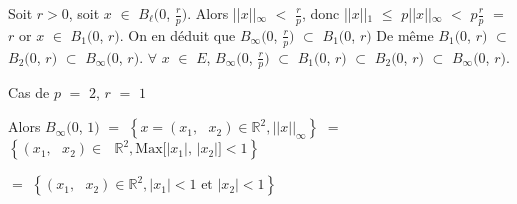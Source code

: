 \documentclass{article}
\begin{document}
\smallbreak 
Soit $r>0$, soit $x$ $\in$ $B_{\ell}(0$, $\frac{r}{p})$. Alors ||$x$||$_{\infty}$ $<$ $\frac{r}{p}$, donc ||$x$||$_1$ $\leqslant$ $p$||$x$||$_{\infty}$ $<$ $p\frac{r}{p}$ $=$ $r$ or $x$ $\in$ $B_1(0$, $r)$.
\smallbreak
On en déduit que $B_{\infty}(0$, $\frac{r}{p})$ $\subset$ $B_1(0$, $r)$
De même $B_1(0$, $r)$ $\subset$ $B_2(0$, $r)$ $\subset$ $B_{\infty}(0$, $r)$.
\bigbreak
\center 
$\forall$ $x$ $\in$ $E$, $B_{\infty}(0$, $\frac{r}{p})$ $\subset$ $B_1(0$, $r)$ $\subset$ $B_2(0$, $r)$ $\subset$ $B_{\infty}(0$, $r)$.

\flushleft
\hspace*{1cm}Cas de $p$ $=$ $2$, $r$ $=$ $1$
\smallbreak

\begin{multicols}{2}

\parindent=1.5cm
Alors $B_{\infty}(0$, $1)$ $=$ $\left\{x=(x_1,\text{ }x_2) \in \mathbb{R}^2,||x||_{\infty} \right\}$ \smallbreak $=$ $\left\{(x_1,\text{ }x_2) \in \text{ }\mathbb{R}^2,\text{Max[|}x_1\text{|, |}x_2\text{|]} <1 \right\}$

\smallbreak
$=$ $\left\{(x_1,\text{ }x_2) \in \mathbb{R}^2,|x_1| < 1 \text{ et } |x_2| < 1 \right\}$
\smallbreak
\hspace{1cm}
\columnbreak

\Bouletrois
\end{multicols}

\smallbreak
\end{document}
